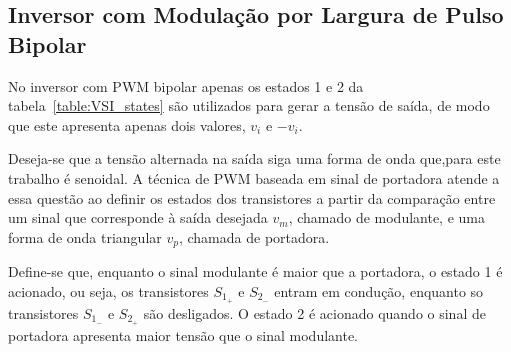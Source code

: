 \documentclass[
	12pt,				%
	openany,
	onseside,
	a4paper,			%
	english,			%
	french,				%
	spanish,			%
	brazil,				%
	]{abntex2}
\begin{document}
\subsection{Inversor com Modulação por Largura de Pulso Bipolar}

No inversor com PWM bipolar apenas os estados 1 e 2 da tabela~\ref{table:VSI_states} são utilizados para gerar a tensão de saída, de modo que este apresenta apenas dois valores, $v_i$ e $-v_i$.

Deseja-se que a tensão alternada na saída siga uma forma de onda que,para este trabalho é senoidal. A técnica de PWM baseada em sinal de portadora atende a essa questão ao definir os estados dos transistores a partir da comparação entre um sinal que corresponde à saída desejada $v_m$, chamado de modulante, e uma forma de onda triangular $v_p$, chamada de portadora.

Define-se que, enquanto o sinal modulante é maior que a portadora, o estado 1 é acionado, ou seja, os transistores $S_{1_+}$ e $S_{2_-}$ entram em condução, enquanto so transistores $S_{1_-}$ e $S_{2_+}$ são desligados. O estado 2 é acionado quando o sinal de portadora apresenta maior tensão que o sinal modulante. 
\end{document}
